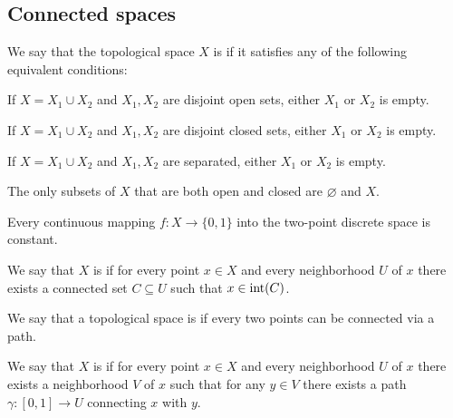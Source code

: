 \subsection{Connected spaces}\label{subsec:connected_sets}

\begin{definition}\label{def:connected_space}\cite[theorem 6.1.1]{Engelking1989}
  We say that the topological space \( X \) is  if it satisfies any of the following equivalent conditions:
  \begin{defenum}
     If \( X = X_1 \cup X_2 \) and \( X_1, X_2 \) are disjoint open sets, either \( X_1 \) or \( X_2 \) is empty.

     If \( X = X_1 \cup X_2 \) and \( X_1, X_2 \) are disjoint closed sets, either \( X_1 \) or \( X_2 \) is empty.

     If \( X = X_1 \cup X_2 \) and \( X_1, X_2 \) are separated, either \( X_1 \) or \( X_2 \) is empty.

     The only subsets of \( X \) that are both open and closed are \( \varnothing \) and \( X \).

     Every continuous mapping \( f: X \to \{ 0, 1 \} \) into the two-point discrete space is constant.
  \end{defenum}
\end{definition}

\begin{definition}\label{def:locally_connected}\cite[exercise 6.3.3]{Engelking1989}
  We say that \( X \) is  if for every point \( x \in X \) and every neighborhood \( U \) of \( x \) there exists a connected set \( C \subseteq U \) such that \( x \in \operatorname{int}(C) \).
\end{definition}

\begin{definition}\label{def:path_connected}\cite[exercise 6.3.9]{Engelking1989}
  We say that a topological space is  if every two points can be connected via a path.
\end{definition}

\begin{definition}\label{def:locally_path_connected}\cite[exercise 6.3.10]{Engelking1989}
  We say that \( X \) is  if for every point \( x \in X \) and every neighborhood \( U \) of \( x \) there exists a neighborhood \( V \) of \( x \) such that for any \( y \in V \) there exists a path \( \gamma: [0, 1] \to U \) connecting \( x \) with \( y \).
\end{definition}

